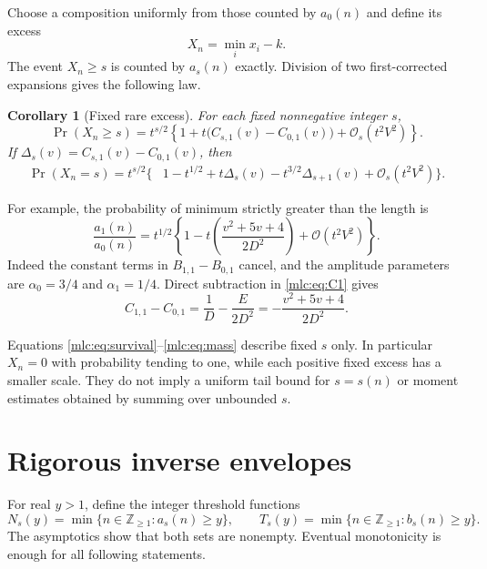 \documentclass[11pt]{article}
\newtheorem{corollary}[theorem]{Corollary}
\theoremstyle{remark}\newtheorem{remark}[theorem]{Remark}
\newcommand{\OO}{\mathcal O}
\begin{document}
Choose a composition uniformly from those counted by $a_0(n)$ and define its excess
\[
 X_n=\min_i x_i-k.
\]
The event $X_n\ge s$ is counted by $a_s(n)$ exactly. Division of two first-corrected expansions gives the following law.

\begin{corollary}[Fixed rare excess]\label{mlc:cor:rare}
For each fixed nonnegative integer $s$,
\begin{equation}\label{mlc:eq:survival}
 \Pr(X_n\ge s)=t^{s/2}
  \left\{1+t\bigl(C_{s,1}(v)-C_{0,1}(v)\bigr)
                +\OO_s(t^2V^2)\right\}.
\end{equation}
If $\Delta_s(v)=C_{s,1}(v)-C_{0,1}(v)$, then
\begin{align}
 \Pr(X_n=s)=t^{s/2}\bigl\{&1-t^{1/2}
       +t\Delta_s(v)-t^{3/2}\Delta_{s+1}(v)
       +\OO_s(t^2V^2)\bigr\}.\label{mlc:eq:mass}
\end{align}
\end{corollary}

For example, the probability of minimum strictly greater than the length is
\begin{equation}\label{mlc:eq:strictprob}
 \frac{a_1(n)}{a_0(n)}=t^{1/2}
 \left\{1-t\left(\frac{v^2+5v+4}{2D^2}\right)
                 +\OO(t^2V^2)\right\}.
\end{equation}
Indeed the constant terms in $B_{1,1}-B_{0,1}$ cancel, and the amplitude parameters are $\alpha_0=3/4$ and $\alpha_1=1/4$. Direct subtraction in \eqref{mlc:eq:C1} gives
\begin{equation}\label{mlc:eq:deltaone}
 C_{1,1}-C_{0,1}=\frac1D-\frac E{2D^2}
                    =-\frac{v^2+5v+4}{2D^2}.
\end{equation}

Equations \eqref{mlc:eq:survival}--\eqref{mlc:eq:mass} describe fixed $s$ only. In particular $X_n=0$ with probability tending to one, while each positive fixed excess has a smaller scale. They do not imply a uniform tail bound for $s=s(n)$ or moment estimates obtained by summing over unbounded $s$.

\section{Rigorous inverse envelopes}\label{mlc:sec:inverse}
For real $y>1$, define the integer threshold functions
\begin{equation}\label{mlc:eq:Ndef}
 N_s(y)=\min\{n\in\mathbb Z_{\ge1}:a_s(n)\ge y\},\qquad
 T_s(y)=\min\{n\in\mathbb Z_{\ge1}:b_s(n)\ge y\}.
\end{equation}
The asymptotics show that both sets are nonempty. Eventual monotonicity is enough for all following statements.
\end{document}
